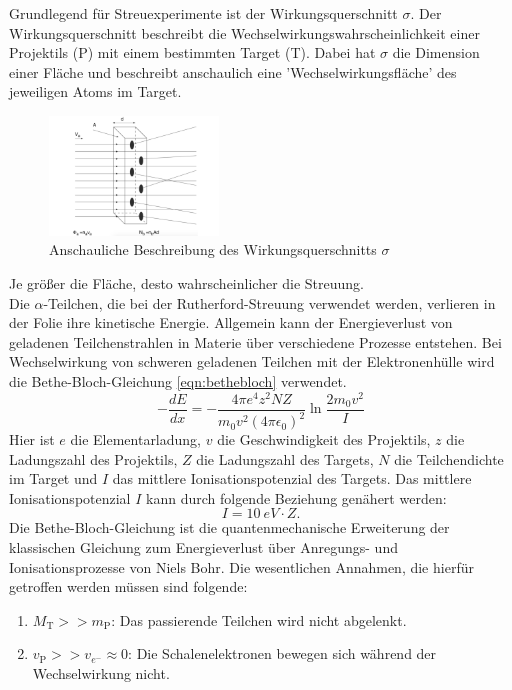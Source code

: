 Grundlegend für Streuexperimente ist der Wirkungsquerschnitt $\sigma$.
Der Wirkungsquerschnitt beschreibt die Wechselwirkungswahrscheinlichkeit einer Projektils (P) mit einem bestimmten Target (T).
Dabei hat $\sigma$ die Dimension einer Fläche und beschreibt anschaulich eine 'Wechselwirkungsfläche' des jeweiligen Atoms im Target.
\begin{figure}[h!]
  \centering
  \includegraphics[width=0.4\textwidth]{images/wq.pdf}
  \caption{Anschauliche Beschreibung des Wirkungsquerschnitts $\sigma$ \cite{povh}}
  \label{fig:wq}
\end{figure}
Je größer die Fläche, desto wahrscheinlicher die Streuung.
%
\\Die $\alpha$-Teilchen, die bei der Rutherford-Streuung verwendet werden, verlieren in der Folie ihre kinetische Energie.
Allgemein kann der Energieverlust von geladenen Teilchenstrahlen in Materie über verschiedene Prozesse entstehen.
Bei Wechselwirkung von schweren geladenen Teilchen mit der Elektronenhülle wird die Bethe-Bloch-Gleichung \eqref{eqn:bethebloch} verwendet.
\begin{equation}
	- \frac{d E}{d x} = - \frac{4 \pi e^4 z^2 N Z}{m_0 v^2 (4 \pi \epsilon_0)^2} \ln{\frac{2 m_0 v^2}{I}}
	\label{eqn:bethebloch}
\end{equation}
Hier ist $e$ die Elementarladung, $v$ die Geschwindigkeit des Projektils, $z$ die Ladungszahl des Projektils, $Z$ die Ladungszahl des Targets, $N$ die Teilchendichte im Target und $I$ das mittlere Ionisationspotenzial des Targets.
Das mittlere Ionisationspotenzial $I$ kann durch folgende Beziehung genähert werden:
\begin{equation*}
	I= \SI{10}{eV} \cdot Z.
\end{equation*}
Die Bethe-Bloch-Gleichung ist die quantenmechanische Erweiterung der klassischen Gleichung zum Energieverlust über Anregungs- und Ionisationsprozesse von Niels Bohr.
Die wesentlichen Annahmen, die hierfür getroffen werden müssen sind folgende:
\begin{enumerate}
	\item $M_{\text{T}} >> m_{\text{P}}$: Das passierende Teilchen wird nicht abgelenkt.
	\item $v_{\text{P}} >> v_{e^-} \approx 0$: Die Schalenelektronen bewegen sich während der Wechselwirkung nicht.
\end{enumerate}
